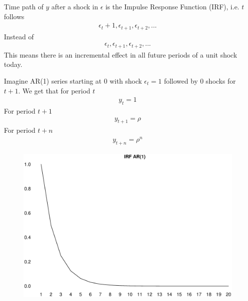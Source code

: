 \documentclass{beamer}
\begin{document}
\begin{frame}
  Time path of $y$ after a shock in $\epsilon$ is the Impulse Response Function (IRF), i.e. $t$ follows
  \begin{align}
    \epsilon_t + 1, \epsilon_{t+1}, \epsilon_{t+2},...
  \end{align}
  Instead of 
  \begin{align}
    \epsilon_t , \epsilon_{t+1}, \epsilon_{t+2},...
  \end{align}
  \medskip
  This means there is an incremental effect in all future periods of a unit shock today.  
\end{frame}

\begin{frame}
  Imagine AR(1) series starting at 0 with shock $\epsilon_t = 1$ followed by 0 shocks for $t+1$.
  We get that for period $t$
  \begin{align}
    y_t = 1
  \end{align}
  \medskip
  For period $t+1$
  \begin{align}
    y_{t+1} = \rho
  \end{align}
  \medskip 
  For period $t+n$
  \begin{align}
    y_{t+n} = \rho^n
  \end{align}
\end{frame}

\begin{frame}
  \begin{figure}
    \includegraphics[scale=.3]{irf_ar1.eps}
  \end{figure}
\end{frame}
\end{document}
